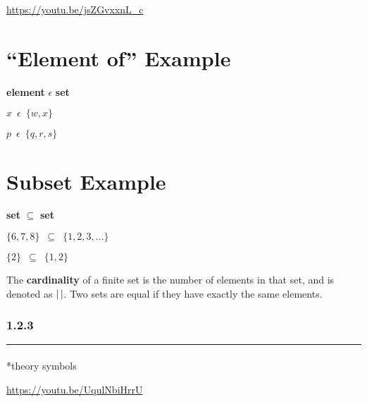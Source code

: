 \documentclass[
  letterpaper,
  DIV=11,
  numbers=noendperiod]{scrreprt}
\makeatletter
\let\oldparagraph\paragraph
\renewcommand{\paragraph}{
    \@ifstar
      \xxxParagraphStar
      \xxxParagraphNoStar
  }
\newcommand{\xxxParagraphStar}[1]{\oldparagraph*{#1}\mbox{}}
\newcommand{\xxxParagraphNoStar}[1]{\oldparagraph{#1}\mbox{}}
\makeatother
\begin{document}
\url{https://youtu.be/jsZGvxxnL_c}

\section{``Element of'' Example}

\textbf{element} \(\epsilon\) \textbf{set}

\(x\enspace \epsilon \enspace \{w,x\}\)

\(p\enspace \epsilon \enspace \{q,r,s\}\)

\section{Subset Example}

\textbf{set} \(\subseteq\) \textbf{set}

\(\{6,7,8\}\enspace \subseteq \enspace \{1,2,3,...\}\)

\(\{2\}\enspace \subseteq \enspace \{1,2\}\)

The {\textbf{cardinality}} of a finite set is the number of elements in
that set, and is denoted as \(|\thinspace|\). Two sets are equal if they
have exactly the same elements.

\subsubsection*{1.2.3}\label{section-4}

\begin{center}\rule{0.5\linewidth}{0.5pt}\end{center}

\paragraph*{theory symbols}\label{theory-symbols}

\url{https://youtu.be/UqulNbiHrrU}
\end{document}
